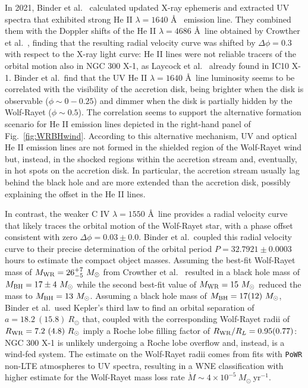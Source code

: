 \documentclass[a4paper,titlepage]{book}     	%
\newcommand{\sun}{\ensuremath{_\odot}}
\newcommand{\mdot}{\ensuremath{\dot{M}}}
\newcommand{\msun}{\ensuremath{M\sun}}
\newcommand{\rsun}{R_{\odot}}
\newcommand{\yr}{\text{yr}}
\newcommand{\mwr}{\ensuremath{M_\textup{WR}}}
\newcommand{\mbh}{\ensuremath{M_\textup{BH}}}
\begin{document}
In 2021, Binder et al.\ \cite{NGC300X-1_Binder2021_BHpreciso} calculated updated X-ray ephemeris and extracted UV spectra that exhibited strong He II $\lambda=1640$ \AA~ emission line. They combined them with the Doppler shifts of the He II $\lambda=4686$ \AA ~line obtained by Crowther et al.\ \cite{NGC300X-1_Crowther2010}, finding that the resulting radial velocity curve was shifted by $\Delta \phi = 0.3$ with respect to the X-ray light curve: He II lines were not reliable tracers of the orbital motion also in NGC 300 X-1, as Laycock et al.\ \cite{laycock2015_IC10X1_measuredshift} already found in IC10 X-1. Binder et al.\ find that the UV He II $\lambda=1640$ \AA~line luminosity seems to be correlated with the visibility of the accretion disk, being brighter when the disk is observable ($\phi \sim 0-0.25$) and dimmer when the disk is partially hidden by the Wolf-Rayet ($\phi \sim 0.5$). The correlation seems to support the alternative formation scenario for He II emission lines depicted in the right-hand panel of Fig.\ \ref{fig:WRBHwind}. According to this alternative mechanism, UV and optical He II emission lines are not formed in the shielded region of the Wolf-Rayet wind but, instead, in the shocked regions within the accretion stream and, eventually, in hot spots on the accretion disk. In particular, the accretion stream usually lag behind the black hole and are more extended than the accretion disk, possibly explaining the offset in the He II lines.

In contrast, the weaker C IV $\lambda=1550$ \AA~line provides a radial velocity curve that likely traces the orbital motion of the Wolf-Rayet star, with a phase offset consistent with zero $\Delta \phi = 0.03 \pm 0.0$. Binder et al.\ coupled this radial velocity curve to their precise determination of the orbital period $P=32.7921 \pm 0.0003$ hours to estimate the compact object masses. Assuming the best-fit Wolf-Rayet mass of $\mwr = 26_{-5}^{+7}~\msun$ from Crowther et al.\ \cite{NGC300X-1_Crowther2010} resulted in a black hole mass of $\mbh = 17 \pm 4~\msun$ while the second best-fit value of $\mwr = 15~\msun$ reduced the mass to $\mbh = 13~\msun$. Assuming a black hole mass of $\mbh = 17(12)~\msun$, Binder et al.\ used Kepler's third law to find an orbital separation of $a = 18.2~(15.8)~\rsun$ that, coupled with the corresponding Wolf-Rayet radii of $R_{\rm WR} = 7.2~(4.8)~\rsun$ imply a Roche lobe filling factor of $R_{\rm WR}/R_L = 0.95 (0.77)$: NGC 300 X-1 is unlikely undergoing a Roche lobe overflow and, instead, is a wind-fed system. The estimate on the Wolf-Rayet radii comes from fits with \texttt{PoWR} non-LTE atmospheres \cite{WRnonLTEatmospheresPoWR_Todt2015} to UV spectra, resulting in a WNE classification with higher estimate for the Wolf-Rayet mass loss rate $\mdot \sim 4 \times 10^{-5}~\msun~\yr^{-1}$.
\end{document}
